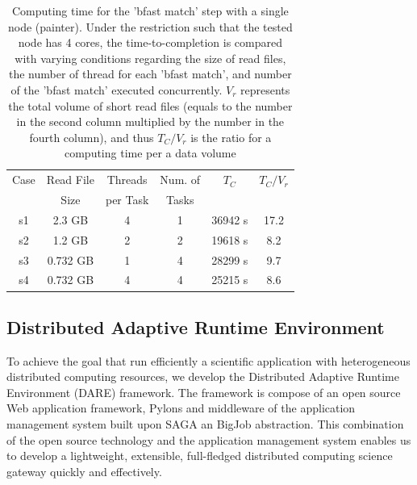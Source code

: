 \documentclass{acm_proc_article-sp}
\begin{document}
 \begin{table}
 \small
 \begin{tabular}{|c|c|c|c|c|c|} 
 \hline 
Case & Read File  & Threads & Num. of   & $T_C$ & $T_C/V_{r}$ \\
& Size &  per Task &  Tasks &  &  \\  \hline
s1 & 2.3 GB &  4 & 1 & 36942 s & 17.2  \\
s2 & 1.2 GB & 2 & 2 & 19618 s & 8.2 \\
s3 & 0.732 GB & 1 & 4 & 28299 s  & 9.7\\ 
s4& 0.732  GB & 4 & 4 & 25215 s & 8.6 \\

 \hline
 \end{tabular}
 
 \caption{Computing time for the 'bfast match' step with a single node
   (painter). Under the restriction such that the tested node has 4
   cores, the time-to-completion is compared with varying conditions
   regarding the size of read files, the number of thread for each
   'bfast match', and number of the 'bfast match' executed concurrently.  $V_r$ represents the total volume of short read files (equals to the number in the second column multiplied by the number in the fourth column), and thus $T_C/V_{r}$ is the ratio for a computing time per a data volume}
    \label{table:understandio}
\end{table}





\subsection{Distributed Adaptive Runtime Environment}

To achieve the goal that run efficiently a scientific application with heterogeneous distributed
computing resources, we develop the Distributed Adaptive Runtime
Environment (DARE) framework\cite{dareurl}.  The framework is compose
of an open source Web application framework, Pylons and middleware of
the application management system built upon SAGA an BigJob
abstraction\cite{saga-ccgrid10,saga-royalsoc,saga-web,jha2009developing,ecmls10}.
This combination of the open source technology and the application
management system enables us to develop a lightweight, extensible,
full-fledged distributed computing science gateway quickly and
effectively\cite{pylonsurl}.
\end{document}
